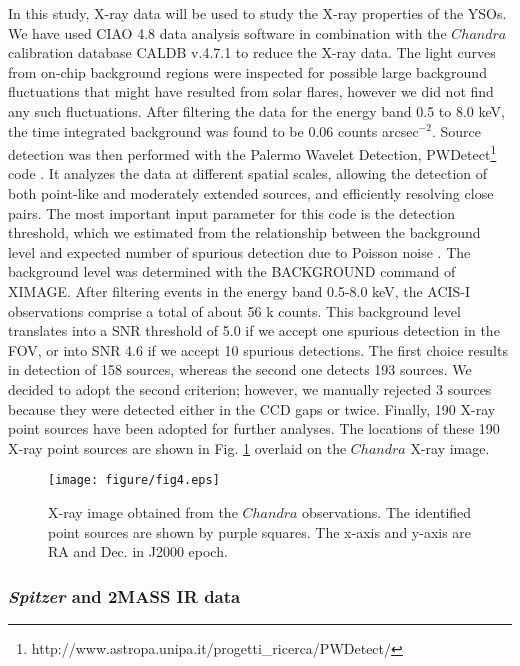 \documentclass[a4paper,fleqn,usenatbib,useAMS]{mnras}
\begin{document}
In this study, X-ray data will be used to study the X-ray properties of the YSOs.
We have used CIAO 4.8 data analysis software in combination with the $Chandra$ calibration database CALDB v.4.7.1
to reduce the X-ray data. 
The  light curves from on-chip  background regions were inspected for possible 
large background fluctuations that might have resulted from solar flares, 
however we did not find any such fluctuations. 
After filtering the data for the energy band 0.5 to 8.0 keV, 
the time integrated background was found to be 0.06 counts arcsec$^{-2}$.
Source detection was then performed with the Palermo Wavelet Detection, 
PWDetect\footnote{http://www.astropa.unipa.it/progetti\_ricerca/PWDetect/} code \citep{1997ApJ...483..350D}. 
It analyzes the data at different spatial scales, allowing the detection of both point-like and moderately extended sources, 
and efficiently resolving close pairs. The most important input parameter for this code is the detection threshold, 
which we estimated from the relationship between the background level and expected number of spurious detection 
due to Poisson noise \citep[for detail, see][]{1997ApJ...483..350D}. 
The background level was determined with the {\sc BACKGROUND} command of {\sc XIMAGE}. 
After filtering events in the energy band 0.5-8.0 keV,
the ACIS-I observations comprise a total of about 56 k counts.
This background level translates into a SNR threshold 
of 5.0 if we accept one spurious detection in the 
FOV, or into  SNR 4.6 if we accept 10 spurious detections.  
The first choice results in detection of 158 sources, whereas the second one detects 193 sources. 
We decided to adopt the second criterion; however, we manually rejected 3 sources because they were detected  either in the CCD 
gaps or twice.  Finally, 190 X-ray point sources have been adopted for further analyses.
The locations of these 190 X-ray point sources are shown in Fig. \ref {xray} overlaid on the $Chandra$ X-ray image.


\begin{figure}
\centering\texttt{[image: figure/fig4.eps]}
\caption{\label{xray} X-ray image obtained from the $Chandra$ observations. 
The identified point sources are shown by purple squares. The x-axis and y-axis are RA and Dec. in J2000 epoch. }
\end{figure}

\subsubsection{{\it Spitzer} and 2MASS IR data \label{obs-spit}}
\end{document}
